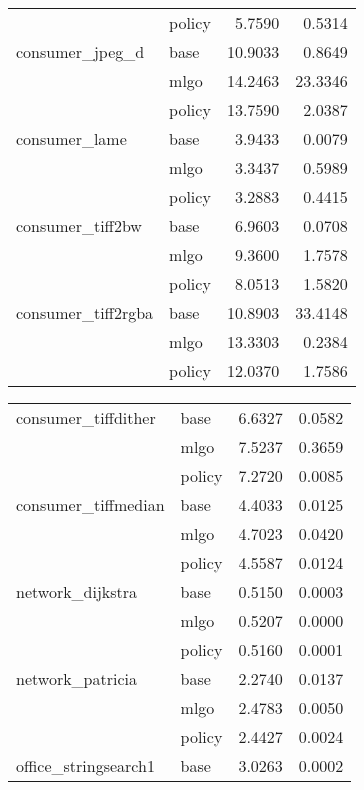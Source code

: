 \begin{table*}
\begin{tabular}[t]{llrr}
                & policy &        5.7590 &    0.5314 \\
consumer\_jpeg\_d & base &       10.9033 &    0.8649 \\
                & mlgo &       14.2463 &   23.3346 \\
                & policy &       13.7590 &    2.0387 \\
consumer\_lame & base &        3.9433 &    0.0079 \\
                & mlgo &        3.3437 &    0.5989 \\
                & policy &        3.2883 &    0.4415 \\
consumer\_tiff2bw & base &        6.9603 &    0.0708 \\
                & mlgo &        9.3600 &    1.7578 \\
                & policy &        8.0513 &    1.5820 \\
consumer\_tiff2rgba & base &       10.8903 &   33.4148 \\
                & mlgo &       13.3303 &    0.2384 \\
                & policy &       12.0370 &    1.7586 \\
\end{tabular}
\begin{tabular}[t]{llrr}
consumer\_tiffdither & base &        6.6327 &    0.0582 \\
                & mlgo &        7.5237 &    0.3659 \\
                & policy &        7.2720 &    0.0085 \\
consumer\_tiffmedian & base &        4.4033 &    0.0125 \\
                & mlgo &        4.7023 &    0.0420 \\
                & policy &        4.5587 &    0.0124 \\
network\_dijkstra & base &        0.5150 &    0.0003 \\
                & mlgo &        0.5207 &    0.0000 \\
                & policy &        0.5160 &    0.0001 \\
network\_patricia & base &        2.2740 &    0.0137 \\
                & mlgo &        2.4783 &    0.0050 \\
                & policy &        2.4427 &    0.0024 \\
office\_stringsearch1 & base &        3.0263 &    0.0002 \\

\end{tabular}
\end{table*}

